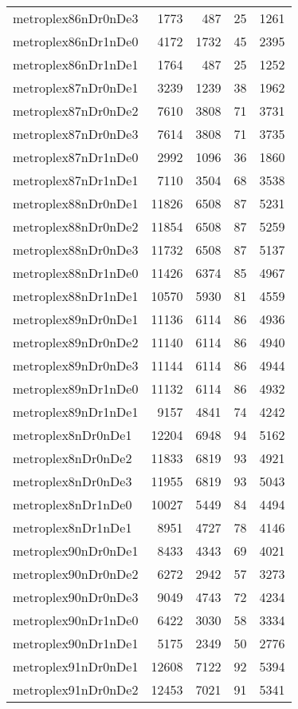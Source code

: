 \begin{longtable}{lrrrr}
metroplex86nDr0nDe3 & 1773 & 487 & 25 & 1261 \\
metroplex86nDr1nDe0 & 4172 & 1732 & 45 & 2395 \\
metroplex86nDr1nDe1 & 1764 & 487 & 25 & 1252 \\
metroplex87nDr0nDe1 & 3239 & 1239 & 38 & 1962 \\
metroplex87nDr0nDe2 & 7610 & 3808 & 71 & 3731 \\
metroplex87nDr0nDe3 & 7614 & 3808 & 71 & 3735 \\
metroplex87nDr1nDe0 & 2992 & 1096 & 36 & 1860 \\
metroplex87nDr1nDe1 & 7110 & 3504 & 68 & 3538 \\
metroplex88nDr0nDe1 & 11826 & 6508 & 87 & 5231 \\
metroplex88nDr0nDe2 & 11854 & 6508 & 87 & 5259 \\
metroplex88nDr0nDe3 & 11732 & 6508 & 87 & 5137 \\
metroplex88nDr1nDe0 & 11426 & 6374 & 85 & 4967 \\
metroplex88nDr1nDe1 & 10570 & 5930 & 81 & 4559 \\
metroplex89nDr0nDe1 & 11136 & 6114 & 86 & 4936 \\
metroplex89nDr0nDe2 & 11140 & 6114 & 86 & 4940 \\
metroplex89nDr0nDe3 & 11144 & 6114 & 86 & 4944 \\
metroplex89nDr1nDe0 & 11132 & 6114 & 86 & 4932 \\
metroplex89nDr1nDe1 & 9157 & 4841 & 74 & 4242 \\
metroplex8nDr0nDe1 & 12204 & 6948 & 94 & 5162 \\
metroplex8nDr0nDe2 & 11833 & 6819 & 93 & 4921 \\
metroplex8nDr0nDe3 & 11955 & 6819 & 93 & 5043 \\
metroplex8nDr1nDe0 & 10027 & 5449 & 84 & 4494 \\
metroplex8nDr1nDe1 & 8951 & 4727 & 78 & 4146 \\
metroplex90nDr0nDe1 & 8433 & 4343 & 69 & 4021 \\
metroplex90nDr0nDe2 & 6272 & 2942 & 57 & 3273 \\
metroplex90nDr0nDe3 & 9049 & 4743 & 72 & 4234 \\
metroplex90nDr1nDe0 & 6422 & 3030 & 58 & 3334 \\
metroplex90nDr1nDe1 & 5175 & 2349 & 50 & 2776 \\
metroplex91nDr0nDe1 & 12608 & 7122 & 92 & 5394 \\
metroplex91nDr0nDe2 & 12453 & 7021 & 91 & 5341 \\

\end{longtable}
